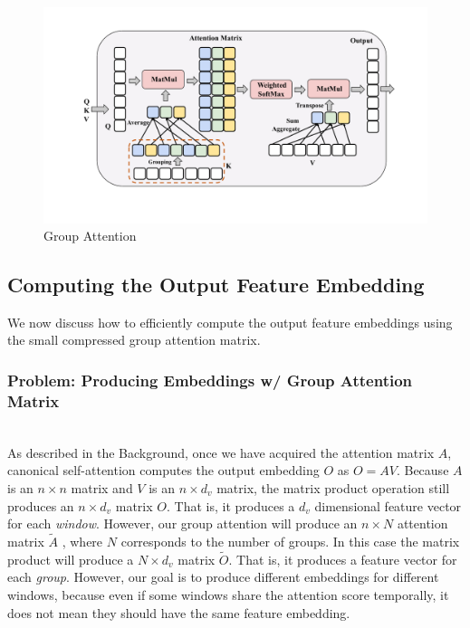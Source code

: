 \begin{sloppypar}

\begin{figure}[]
\vspace{-3mm}
    \centering    \includegraphics[width=1.05\columnwidth]{figures/attention.pdf}
    \vspace{-7mm}
    \caption{Group Attention}
    \label{fig.group}
    \vspace{-5mm}
\end{figure}

\subsection{Computing the Output Feature Embedding}
\label{sec.group.embedding}
We now discuss how to efficiently compute the output feature embeddings using the small compressed group attention matrix.

\vspace{-1mm}
\subsubsection{Problem: Producing Embeddings w/ Group Attention Matrix\nopunct}\ \\
As described in the Background, once we have acquired the attention matrix $A$, canonical self-attention computes the output embedding $O$ as $\mathit{O = AV}$. Because $A$ is an $n \times n$ matrix and $V$ is an $n \times d_v$ matrix, the matrix product operation still produces an $n \times d_v$ matrix $O$. That is, it produces a $d_v$ dimensional feature vector for each {\it window}.
However, our group attention will produce an $n \times N$ attention matrix $\widetilde{A}$ , where $N$ corresponds to the number of groups. 
In this case the matrix product will produce a $N \times d_v$ matrix $\widetilde{O}$. That is, it produces a feature vector for each {\it group}. 
However, our goal is to produce different embeddings for different windows, because even if some windows share the attention score temporally, it does not mean they should have the same feature embedding. 


\end{sloppypar}

